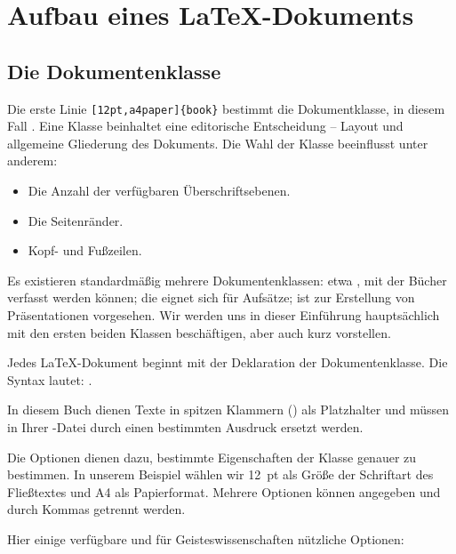 \section{Aufbau eines \LaTeX-Dokuments}

\subsection{Die Dokumentenklasse}
Die erste Linie \verb|[12pt,a4paper]{book}| bestimmt die Dokumentklasse, in diesem Fall . Eine Klasse beinhaltet eine editorische Entscheidung -- Layout und allgemeine Gliederung des Dokuments. Die Wahl der Klasse beeinflusst unter anderem:

\begin{itemize}
\item Die Anzahl der verfügbaren Überschriftsebenen.
\item Die Seitenränder.
\item Kopf- und Fußzeilen.
\end{itemize}

Es existieren standardmäßig mehrere Dokumentenklassen: etwa , mit der Bücher verfasst werden können; die  eignet sich für Aufsätze;  ist zur Erstellung von Präsentationen vorgesehen. Wir werden uns in dieser Einführung hauptsächlich mit den ersten beiden Klassen beschäftigen,  aber auch kurz vorstellen.


Jedes \LaTeX-Dokument beginnt mit der Deklaration der Dokumentenklasse. Die Syntax lautet: .

\begin{attention}
In diesem Buch dienen Texte in spitzen Klammern () als Platzhalter und müssen in Ihrer -Datei durch einen bestimmten Ausdruck ersetzt werden.
\end{attention}

Die Optionen dienen dazu, bestimmte Eigenschaften der Klasse genauer zu bestimmen. In unserem Beispiel wählen wir 12~pt als Größe der Schriftart des Fließtextes und A4 als Papierformat. Mehrere Optionen können angegeben und durch Kommas getrennt werden.\label{optionsclasse}

Hier einige verfügbare und für Geisteswissenschaften nützliche Optionen:

